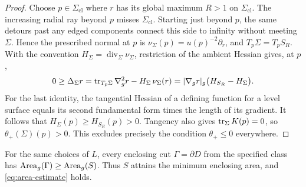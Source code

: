 \begin{proof}
Choose $p\in\Sigma_{\mathrm{cl}}$ where $r$ has its global maximum
$R>1$ on $\Sigma_{\mathrm{cl}}$.  The increasing radial ray beyond $p$
misses $\Sigma_{\mathrm{cl}}$.  Starting just beyond $p$, the same detours
past any edged components connect this side to infinity without meeting
$\Sigma$.  Hence the prescribed normal at $p$ is
$\nu_\Sigma(p)=u(p)^{-2}\partial_r$, and $T_p\Sigma=T_pS_R$.
With the convention $H_\Sigma=\operatorname{div}_\Sigma
\nu_\Sigma$, restriction of the ambient Hessian gives, at $p$,
\[
 0\ge\Delta_\Sigma r
 =\operatorname{tr}_{T_p\Sigma}\nabla_g^2r-H_\Sigma\,\nu_\Sigma(r)
 =|\nabla_g r|_g\bigl(H_{S_R}-H_\Sigma\bigr).
\]
For the last identity, the tangential Hessian of a defining function for a
level surface equals its second fundamental form times the length of its
gradient.  It follows that $H_\Sigma(p)\ge H_{S_R}(p)>0$.  Tangency also gives
$\operatorname{tr}_\Sigma K(p)=0$, so $\theta_+(\Sigma)(p)>0$.  This excludes precisely
the condition $\theta_+\le0$ everywhere.
\end{proof}

\begin{lemma}\label{lem:area-minimum}
For the same choices of $L$, every enclosing cut $\Gamma=\partial D$ from the
specified class has $\operatorname{Area}_g(\Gamma)\ge\operatorname{Area}_g(S)$.  Thus $S$ attains the
minimum enclosing area, and \eqref{eq:area-estimate} holds.
\end{lemma}

